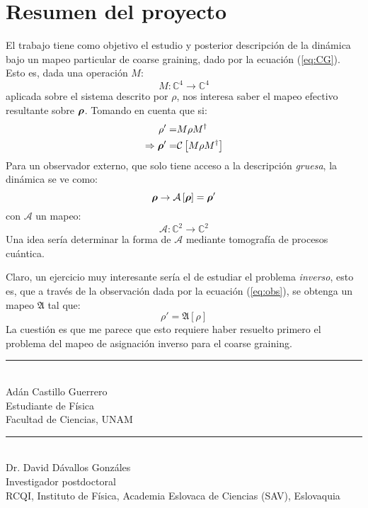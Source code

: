 \documentclass[onecolumn,11pt]{article}
\newcommand{\Cc}{\mathcal{C}} %
\newcommand{\Hh}{\mathbb{C}} %
\newcommand{\CG}[1]{\Cc\left[#1\right]}
\newcommand*{\B}[1]{\ifmmode\bm{#1}\else\textbf{#1}\fi}
\begin{document}
\vspace{0.5cm}
\section{Resumen del proyecto}

El trabajo tiene como objetivo el estudio y posterior descripción de la dinámica bajo un mapeo particular de coarse graining, dado por la ecuación (\ref{eq:CG}). Esto es, dada una operación $M$:
\begin{equation}
    M:\Hh^{4}\rightarrow\Hh^{4}
\end{equation}
aplicada sobre el sistema descrito por $\rho$, nos interesa saber el mapeo efectivo resultante sobre $\B{\rho}$. Tomando en cuenta que si:
\begin{align}
    \rho'=&M\rho M^{\dag}\\
    \Rightarrow \B{\rho}'=&\CG{M\rho M^{\dag}}
\end{align}
Para un observador externo, que solo tiene acceso a la descripción \textit{gruesa}, la dinámica se ve como:
\begin{equation}\label{eq:obs}
    \B{\rho}\rightarrow\mathcal{A}\left[\B{\rho}\right]=\B{\rho}'
\end{equation}
con $\mathcal{A}$ un mapeo:
\begin{equation}
    \mathcal{A}:\Hh^{2}\rightarrow\Hh^{2}
\end{equation}
Una idea sería determinar la forma de $\mathcal{A}$ mediante tomografía de procesos cuántica. 

Claro, un ejercicio muy interesante sería el de estudiar el problema \textit{inverso}, esto es, que a través de la observación dada por la ecuación (\ref{eq:obs}), se obtenga un mapeo $\mathfrak{A}$ tal que:
\begin{equation}
    \rho'=\mathfrak{A}\left[\rho\right]
\end{equation}
La cuestión es que me parece que esto requiere haber resuelto primero el problema del mapeo de asignación inverso para el coarse graining.


\begin{center}
    \rule{200pt}{0.4pt}\\
    Adán Castillo Guerrero \\
    Estudiante de Física \\
    Facultad de Ciencias, UNAM \\
    
\end{center}

\vspace{1.0cm}

\begin{center}
    \rule{200pt}{0.4pt}\\
    Dr. David Dávallos Gonzáles \\
    Investigador postdoctoral \\
    RCQI, Instituto de Física, Academia Eslovaca de Ciencias (SAV), Eslovaquia\\
    
\end{center}


\end{document}
